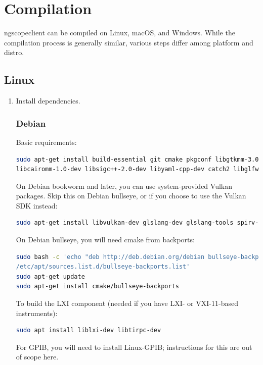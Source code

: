 \section{Compilation}

ngscopeclient can be compiled on Linux, macOS, and Windows. While the compilation process is generally similar, various
steps differ among platform and distro.

\subsection{Linux}
\begin{enumerate}

\item Install dependencies.

\subsubsection{Debian}

Basic requirements:
\begin{lstlisting}[language=sh, numbers=none]
sudo apt-get install build-essential git cmake pkgconf libgtkmm-3.0-dev \
libcairomm-1.0-dev libsigc++-2.0-dev libyaml-cpp-dev catch2 libglfw3-dev curl xzip
\end{lstlisting}

On Debian bookworm and later, you can use system-provided Vulkan packages. Skip this on Debian bullseye, or if you
choose to use the Vulkan SDK instead:
\begin{lstlisting}[language=sh, numbers=none]
sudo apt-get install libvulkan-dev glslang-dev glslang-tools spirv-tools glslc
\end{lstlisting}

On Debian bullseye, you will need cmake from backports:
\begin{lstlisting}[language=sh, numbers=none]
sudo bash -c 'echo "deb http://deb.debian.org/debian bullseye-backports main" >> \
/etc/apt/sources.list.d/bullseye-backports.list'
sudo apt-get update
sudo apt-get install cmake/bullseye-backports
\end{lstlisting}

To build the LXI component (needed if you have LXI- or VXI-11-based instruments):
\begin{lstlisting}[language=sh, numbers=none]
sudo apt install liblxi-dev libtirpc-dev
\end{lstlisting}

For GPIB, you will need to install Linux-GPIB; instructions for this are out of scope here.


\end{enumerate}
